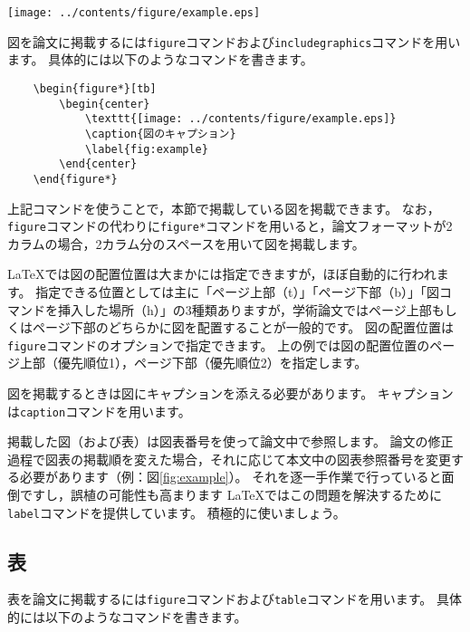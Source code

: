 \begin{figure*}[tb]
\begin{center}
\texttt{[image: ../contents/figure/example.eps]}
\caption{図のキャプション}
\label{fig:example}
\end{center}
\end{figure*}

図を論文に掲載するには{\tt figure}コマンドおよび{\tt includegraphics}コマンドを用います。
具体的には以下のようなコマンドを書きます。

\begin{verbatim}
    \begin{figure*}[tb]
        \begin{center}
            \texttt{[image: ../contents/figure/example.eps]}
            \caption{図のキャプション}
            \label{fig:example}
        \end{center}
    \end{figure*}
\end{verbatim}
上記コマンドを使うことで，本節で掲載している図を掲載できます。
なお，{\tt figure}コマンドの代わりに{\tt figure*}コマンドを用いると，論文フォーマットが2カラムの場合，2カラム分のスペースを用いて図を掲載します。

LaTeXでは図の配置位置は大まかには指定できますが，ほぼ自動的に行われます。
指定できる位置としては主に「ページ上部（t）」「ページ下部（b）」「図コマンドを挿入した場所（h）」の3種類ありますが，学術論文ではページ上部もしくはページ下部のどちらかに図を配置することが一般的です。
図の配置位置は{\tt figure}コマンドのオプションで指定できます。
上の例では図の配置位置のページ上部（優先順位1），ページ下部（優先順位2）を指定します。

図を掲載するときは図にキャプションを添える必要があります。
キャプションは{\tt caption}コマンドを用います。

掲載した図（および表）は図表番号を使って論文中で参照します。
論文の修正過程で図表の掲載順を変えた場合，それに応じて本文中の図表参照番号を変更する必要があります（例：図\ref{fig:example}）。
それを逐一手作業で行っていると面倒ですし，誤植の可能性も高まります
LaTeXではこの問題を解決するために{\tt label}コマンドを提供しています。
積極的に使いましょう。


\subsection{表}
表を論文に掲載するには{\tt figure}コマンドおよび{\tt table}コマンドを用います。
具体的には以下のようなコマンドを書きます。

